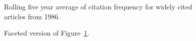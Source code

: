 \documentclass[
  10pt,
  letterpaper,
  DIV=11,
  numbers=noendperiod,
  twoside]{scrartcl}
\begin{document}
\begin{figure}


\caption{\label{fig-citation-spaghetti-1986}Rolling five year average of
citation frequency for widely cited articles from 1986.}

\end{figure}%

\begin{figure}


\caption{\label{fig-citation-facet-1986}Faceted version of
Figure~\ref{fig-citation-spaghetti-1986}.}

\end{figure}%
\end{document}
